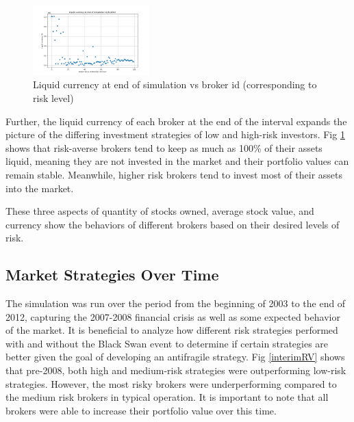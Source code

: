 \documentclass[letterpaper, 11 pt, proceedings]{IEEEtran}
\begin{document}

	\begin{figure}[h]
		\centering
		\includegraphics[width=0.4\textwidth]{liquidCurrency.png}
		\caption{Liquid currency at end of simulation vs broker id (corresponding to risk level)}
		\label{liquidvID}
	\end{figure}
	\FloatBarrier	

	Further, the liquid currency of each broker at the end of the interval expands the picture of the differing investment strategies of low and high-risk investors. Fig \ref{liquidvID} shows that risk-averse brokers tend to keep as much as 100\% of their assets liquid, meaning they are not invested in the market and their portfolio values can remain stable. Meanwhile, higher risk brokers tend to invest most of their assets into the market.
	
	These three aspects of quantity of stocks owned, average stock value, and currency show the behaviors of different brokers based on their desired levels of risk.

	\subsection{Market Strategies Over Time}\label{subsec:results_midpoint}
	The simulation was run over the period from the beginning of 2003 to the end of 2012, capturing the 2007-2008 financial crisis as well as some expected behavior of the market. It is beneficial to analyze how different risk strategies performed with and without the Black Swan event to determine if certain strategies are better given the goal of developing an antifragile strategy. Fig \ref{interimRV} shows that pre-2008, both high and medium-risk strategies were outperforming low-risk strategies. However, the most risky brokers were underperforming compared to the medium risk brokers in typical operation. It is important to note that all brokers were able to increase their portfolio value over this time.
\end{document}
